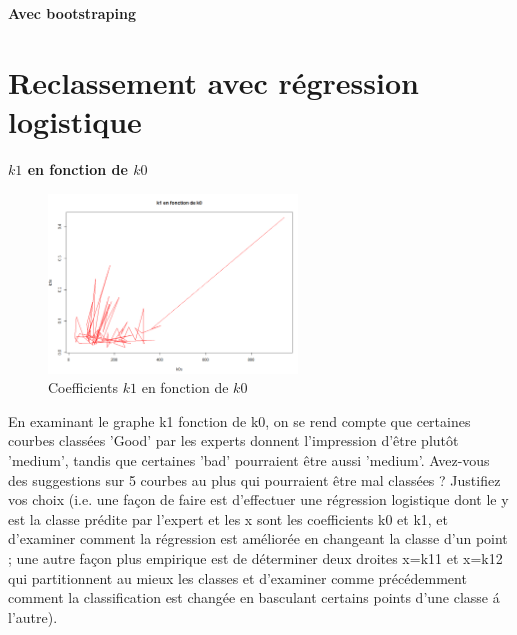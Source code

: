 \documentclass[12pt]{article}
\begin{document}
\textbf{Avec bootstraping}


\newpage
\section{Reclassement avec r\'egression logistique}

\textbf{$k1$ en fonction de $k0$}

\begin{figure}[H]
 \centering %
	\includegraphics[width=250px]{k0_k1}
  \caption{\label{fig:k0_k1} Coefficients $k1$ en fonction de $k0$}
\end{figure}
 
En examinant le graphe k1 fonction de k0, on se rend compte que certaines courbes
class\'ees 'Good' par les experts donnent l'impression d'\^etre plut\^ot 'medium', tandis que
certaines 'bad' pourraient \^etre aussi 'medium'. 
\newline
Avez-vous des suggestions sur 5 courbes au
plus qui pourraient \^etre mal class\'ees ? Justifiez vos choix (i.e. une fa\c con de faire est
d'effectuer une r\'egression logistique dont le y est la classe pr\'edite par l'expert et les x sont
les coefficients k0 et k1, et d'examiner comment la r\'egression est am\'elior\'ee en changeant la
classe d'un point ; une autre fa\c con plus empirique est de d\'eterminer deux droites x=k11 et
x=k12 qui partitionnent au mieux les classes et d'examiner comme pr\'ec\'edemment comment
la classification est chang\'ee en basculant certains points d'une classe \'a l'autre).
\end{document}
